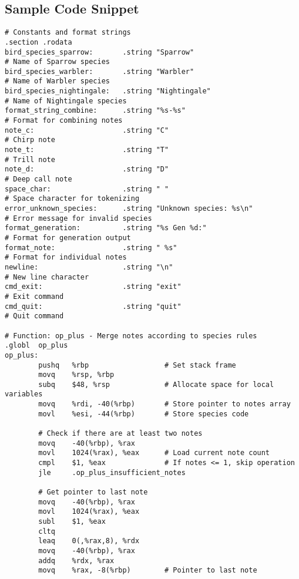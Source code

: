 \documentclass[11pt]{article}
\begin{document}
\subsection{Sample Code Snippet}
\begin{lstlisting}[language={[x86masm]Assembler}, basicstyle=\ttfamily\footnotesize]
# Constants and format strings
.section .rodata
bird_species_sparrow:       .string "Sparrow"               
# Name of Sparrow species
bird_species_warbler:       .string "Warbler"               
# Name of Warbler species
bird_species_nightingale:   .string "Nightingale"           
# Name of Nightingale species
format_string_combine:      .string "%s-%s"                 
# Format for combining notes
note_c:                     .string "C"                     
# Chirp note
note_t:                     .string "T"                     
# Trill note
note_d:                     .string "D"                     
# Deep call note
space_char:                 .string " "                     
# Space character for tokenizing
error_unknown_species:      .string "Unknown species: %s\n" 
# Error message for invalid species
format_generation:          .string "%s Gen %d:"            
# Format for generation output
format_note:                .string " %s"                   
# Format for individual notes
newline:                    .string "\n"                    
# New line character
cmd_exit:                   .string "exit"                  
# Exit command
cmd_quit:                   .string "quit"                  
# Quit command

# Function: op_plus - Merge notes according to species rules
.globl  op_plus
op_plus:
        pushq   %rbp                  # Set stack frame
        movq    %rsp, %rbp
        subq    $48, %rsp             # Allocate space for local variables
        movq    %rdi, -40(%rbp)       # Store pointer to notes array
        movl    %esi, -44(%rbp)       # Store species code
        
        # Check if there are at least two notes
        movq    -40(%rbp), %rax
        movl    1024(%rax), %eax      # Load current note count
        cmpl    $1, %eax              # If notes <= 1, skip operation
        jle     .op_plus_insufficient_notes
        
        # Get pointer to last note
        movq    -40(%rbp), %rax
        movl    1024(%rax), %eax
        subl    $1, %eax
        cltq
        leaq    0(,%rax,8), %rdx
        movq    -40(%rbp), %rax
        addq    %rdx, %rax
        movq    %rax, -8(%rbp)        # Pointer to last note
        

\end{lstlisting}
\end{document}
